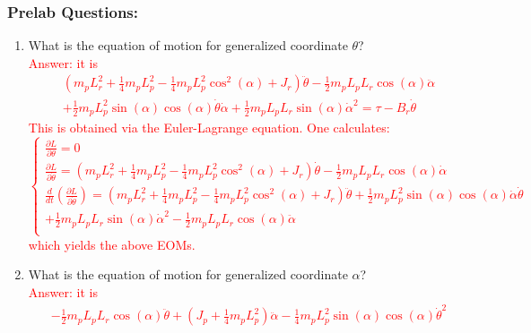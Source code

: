 \documentclass[12pt]{report}
\newcommand\drew[1]{\textcolor{red}{#1}}
\newcommand{\pder}[2]{\frac{\partial #1}{\partial #2}}
\begin{document}
\subsubsection{Prelab Questions:}\label{subsubsection:lab2s_prelab}
\begin{enumerate}
    \item What is the equation of motion for generalized coordinate $\theta$?\\
          \drew{Answer: it is
              \begin{align*}
                   & \left(m_p L_{r}^{2} + \frac{1}{4} m_p L_{p}^{2} - \frac{1}{4} m_p L_{p}^{2} \cos^2(\alpha) + J_r\right) \ddot{\theta} - \frac{1}{2} m_p L_p L_r \cos(\alpha) \ddot{\alpha} \\
                   & + \frac{1}{2} m_p L_{p}^{2} \sin(\alpha)\cos(\alpha) \dot{\theta}\dot{\alpha} + \frac{1}{2}m_p L_p L_r \sin(\alpha) \dot{\alpha}^{2} = \tau - B_r \dot{\theta}
              \end{align*}
              This is obtained via the Euler-Lagrange equation. One calculates:
              \[
                  \begin{cases}
                      \pder{L}{\theta}=0                                                                                                                                                       \\
                      \pder{L}{\dot{\theta}}=\left( m_pL_r^2 +\frac{1}{4} m_p L_p^2-\frac{1}{4}m_pL_p^2\cos^2(\alpha)+J_r\right)\dot{\theta} - \frac{1}{2} m_pL_pL_r\cos{(\alpha)}\dot{\alpha} \\
                      \frac{d}{dt} \left(\pder{L}{\dot{\theta}}\right)= \left(m_pL_r^2 +\frac{1}{4}m_pL_p^2-\frac{1}
                      {4}m_pL_p^2\cos^2(\alpha)+J_r\right)\ddot{\theta} + \frac{1}{2}m_pL_p^2\sin{(\alpha)}\cos{(\alpha)} \dot{\alpha}\dot{\theta}                                             \\+ \frac{1}{2}m_pL_pL_r\sin{(\alpha)}\dot{\alpha}^2-\frac{1}{2}m_pL_pL_r\cos{(\alpha)}\ddot{\alpha} \\
                  \end{cases}
              \]
              which yields the above EOMs.}
    \item What is the equation of motion for generalized coordinate $\alpha$?\\
          \drew{Answer: it is
              \begin{align*}
                   & -\frac{1}{2} m_p L_p L_r \cos(\alpha) \ddot{\theta} + \left(J_p + \frac{1}{4} m_p L_{p}^{2}\right)\ddot{\alpha} - \frac{1}{4} m_p L_{p}^{2} \sin(\alpha)\cos(\alpha) \dot{\theta}^{2} \\

\end{align*}}
\end{enumerate}
\end{document}
